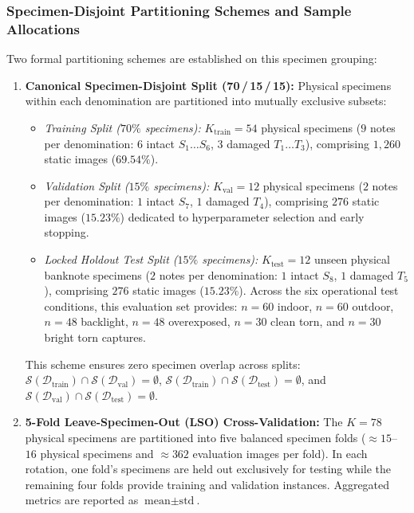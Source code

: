 \documentclass[final,5p,times,twocolumn,authoryear]{elsarticle}
\begin{document}
\subsubsection{Specimen-Disjoint Partitioning Schemes and Sample Allocations}
Two formal partitioning schemes are established on this specimen grouping:
\begin{enumerate}
    \item \textbf{Canonical Specimen-Disjoint Split (70\,/\,15\,/\,15):} Physical specimens within each denomination are partitioned into mutually exclusive subsets:
    \begin{itemize}
        \item \textit{Training Split ($70\%$ specimens):} $K_{\text{train}} = 54$ physical specimens ($9$ notes per denomination: $6$ intact $S_1 \dots S_6$, $3$ damaged $T_1 \dots T_3$), comprising $1{,}260$ static images ($69.54\%$).
        \item \textit{Validation Split ($15\%$ specimens):} $K_{\text{val}} = 12$ physical specimens ($2$ notes per denomination: $1$ intact $S_7$, $1$ damaged $T_4$), comprising $276$ static images ($15.23\%$) dedicated to hyperparameter selection and early stopping.
        \item \textit{Locked Holdout Test Split ($15\%$ specimens):} $K_{\text{test}} = 12$ unseen physical banknote specimens ($2$ notes per denomination: $1$ intact $S_8$, $1$ damaged $T_5$), comprising $276$ static images ($15.23\%$). Across the six operational test conditions, this evaluation set provides: $n = 60$ indoor, $n = 60$ outdoor, $n = 48$ backlight, $n = 48$ overexposed, $n = 30$ clean torn, and $n = 30$ bright torn captures.
    \end{itemize}
    This scheme ensures zero specimen overlap across splits: $\mathcal{S}(\mathcal{D}_{\text{train}}) \cap \mathcal{S}(\mathcal{D}_{\text{val}}) = \emptyset$, $\mathcal{S}(\mathcal{D}_{\text{train}}) \cap \mathcal{S}(\mathcal{D}_{\text{test}}) = \emptyset$, and $\mathcal{S}(\mathcal{D}_{\text{val}}) \cap \mathcal{S}(\mathcal{D}_{\text{test}}) = \emptyset$.
    \item \textbf{5-Fold Leave-Specimen-Out (LSO) Cross-Validation:} The $K = 78$ physical specimens are partitioned into five balanced specimen folds ($\approx 15$--$16$ physical specimens and $\approx 362$ evaluation images per fold). In each rotation, one fold's specimens are held out exclusively for testing while the remaining four folds provide training and validation instances. Aggregated metrics are reported as $\text{mean} \pm \text{std}$.
\end{enumerate}
\end{document}
